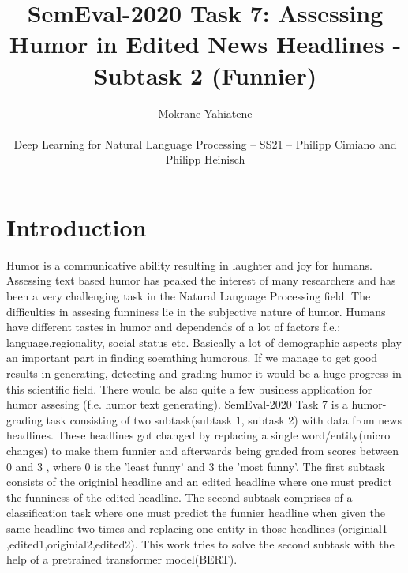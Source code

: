 \documentclass[11pt,a4paper,onecolumn,oneside,notitlepage]{article}
\author{Mokrane Yahiatene\\
	\begin{small}
		Deep Learning for Natural Language Processing -- SS21 -- Philipp Cimiano and Philipp Heinisch
	\end{small}
}
\title{SemEval-2020 Task 7: Assessing Humor in Edited
	News Headlines - Subtask 2 (Funnier)}
\begin{document}
	\maketitle
	
	\section{Introduction}
		Humor is a communicative ability resulting in laughter and joy for humans. Assessing text based humor has peaked the interest of many researchers and has been a very challenging task in the Natural Language Processing field.
		The difficulties in assesing funniness lie in the subjective nature of humor. Humans have different tastes in humor and dependends of a lot of factors  f.e.: language,regionality, social status etc.
		Basically a lot of demographic aspects play an important part in finding soemthing humorous.
		If we manage to get good results in generating, detecting and grading humor it would be a huge progress in this scientific field. There would be also quite a few business application for humor assesing (f.e. humor text generating).
		SemEval-2020 Task 7 is a humor-grading task consisting of two subtask(subtask 1, subtask 2) with data from news headlines. These headlines got changed by replacing a single word/entity(micro changes) to make them funnier and afterwards being graded from scores between 0 and 3 , where 0 is the 'least funny' and 3 the 'most funny'.
		The first subtask consists of the originial headline and an edited headline where one must predict the funniness of the edited headline.
		The second subtask comprises of a classification task where one must predict the funnier headline when given the same headline  two times and replacing one entity in those headlines (originial1 ,edited1,originial2,edited2).
		This work tries to solve the second subtask with the help of a pretrained transformer model(BERT).
		
		
\end{document}
